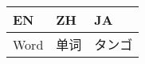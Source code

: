 \documentclass[4pt]{article} %
\begin{document}

\begin{longtable}{@{}p{}%
	p{}%
	p{}@{}}
	    
	\toprule %
	\normalsize
	EN   & ZH     & JA        \\ \midrule
	    
	\endhead %
	    
	\midrule
	\endfoot %
	    
	\bottomrule
	\endlastfoot %
	    
	\fontsize{6.5pt}{5pt}
	      
	Word & 单词 & タンゴ \\ \midrule
	
\end{longtable}
    


\end{document}
